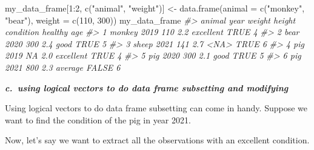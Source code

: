 \documentclass[
]{book}
\newenvironment{Shaded}{\begin{snugshade}}{\end{snugshade}}
\newcommand{\AttributeTok}[1]{\textcolor[rgb]{0.77,0.63,0.00}{#1}}
\newcommand{\CommentTok}[1]{\textcolor[rgb]{0.56,0.35,0.01}{\textit{#1}}}
\newcommand{\DecValTok}[1]{\textcolor[rgb]{0.00,0.00,0.81}{#1}}
\newcommand{\FunctionTok}[1]{\textcolor[rgb]{0.00,0.00,0.00}{#1}}
\newcommand{\NormalTok}[1]{#1}
\newcommand{\OtherTok}[1]{\textcolor[rgb]{0.56,0.35,0.01}{#1}}
\newcommand{\SpecialCharTok}[1]{\textcolor[rgb]{0.00,0.00,0.00}{#1}}
\newcommand{\StringTok}[1]{\textcolor[rgb]{0.31,0.60,0.02}{#1}}
\begin{document}
\begin{Shaded}
\begin{Highlighting}[]
\NormalTok{my\_data\_frame[}\DecValTok{1}\SpecialCharTok{:}\DecValTok{2}\NormalTok{, }\FunctionTok{c}\NormalTok{(}\StringTok{"animal"}\NormalTok{, }\StringTok{"weight"}\NormalTok{)] }\OtherTok{\textless{}{-}}
  \FunctionTok{data.frame}\NormalTok{(}\AttributeTok{animal =} \FunctionTok{c}\NormalTok{(}\StringTok{"monkey"}\NormalTok{, }\StringTok{"bear"}\NormalTok{),}
             \AttributeTok{weight =} \FunctionTok{c}\NormalTok{(}\DecValTok{110}\NormalTok{, }\DecValTok{300}\NormalTok{))}
\NormalTok{my\_data\_frame}
\CommentTok{\#\textgreater{}   animal year weight height condition healthy age}
\CommentTok{\#\textgreater{} 1 monkey 2019    110    2.2 excellent    TRUE   4}
\CommentTok{\#\textgreater{} 2   bear 2020    300    2.4      good    TRUE   5}
\CommentTok{\#\textgreater{} 3  sheep 2021    141    2.7      \textless{}NA\textgreater{}    TRUE   6}
\CommentTok{\#\textgreater{} 4    pig 2019     NA    2.0 excellent    TRUE   4}
\CommentTok{\#\textgreater{} 5    pig 2020    300    2.1      good    TRUE   5}
\CommentTok{\#\textgreater{} 6    pig 2021    800    2.3   average   FALSE   6}
\end{Highlighting}
\end{Shaded}

\textbf{\emph{c.~using logical vectors to do data frame subsetting and modifying}}

Using logical vectors to do data frame subsetting can come in handy. Suppose we want to find the condition of the pig in year 2021.

\begin{Shaded}
\end{Shaded}

Now, let's say we want to extract all the observations with an excellent condition.
\end{document}
